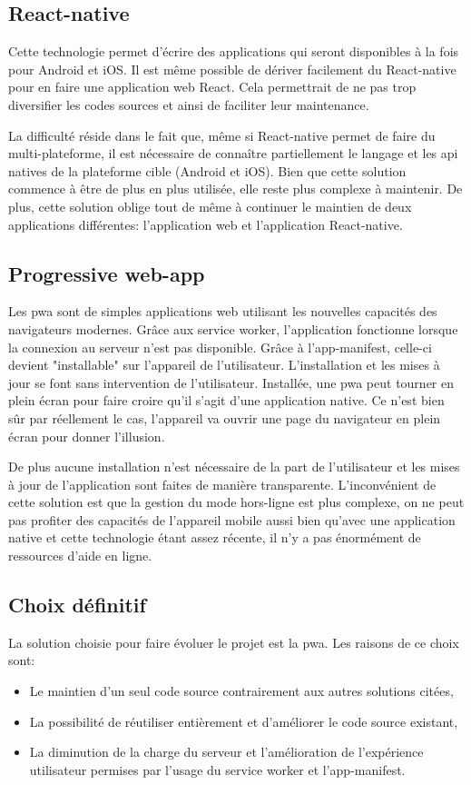 \documentclass{EPL-master-thesis-covers-FR}
\begin{document}
			\subsection*{React-native}
				Cette technologie permet d'écrire des applications qui seront disponibles à la fois pour Android et iOS. Il est même possible de dériver facilement du React-native pour en faire une application web React. Cela permettrait de ne pas trop diversifier les codes sources et ainsi de faciliter leur maintenance.
				
				La difficulté réside dans le fait que, même si React-native permet de faire du multi-plateforme, il est nécessaire de connaître partiellement le langage et les \gls{api} natives de la plateforme cible (Android et iOS). Bien que cette solution commence à être de plus en plus utilisée, elle reste plus complexe à maintenir. De plus, cette solution oblige tout de même à continuer le maintien de deux applications différentes: l'application web et l'application React-native.
				
			\subsection*{Progressive web-app}
				Les \gls{pwa} sont de simples applications web utilisant les nouvelles capacités des navigateurs modernes. Grâce aux service worker, l'application fonctionne lorsque la connexion au serveur n'est pas disponible. Grâce à l'app-manifest, celle-ci devient "installable" sur l'appareil de l'utilisateur. L'installation et les mises à jour se font sans intervention de l'utilisateur. Installée, une \gls{pwa} peut tourner en plein écran pour faire croire qu'il s'agit d'une application native. Ce n'est bien sûr par réellement le cas, l'appareil va ouvrir une page du navigateur en plein écran pour donner l'illusion.
				
				De plus aucune installation n'est nécessaire de la part de l'utilisateur et les mises à jour de l'application sont faites de manière transparente. L'inconvénient de cette solution est que la gestion du mode hors-ligne est plus complexe, on ne peut pas profiter des capacités de l'appareil mobile aussi bien qu'avec une application native et cette technologie étant assez récente, il n'y a pas énormément de ressources d'aide en ligne.
				
			\subsection{Choix définitif} 
				La solution choisie pour faire évoluer le projet est la \gls{pwa}. Les raisons de ce choix sont:
				\begin{itemize}
					\item Le maintien d'un seul code source contrairement aux autres solutions citées,
					\item La possibilité de réutiliser entièrement et d'améliorer le code source existant,
					\item La diminution de la charge du serveur et l'amélioration de l'expérience utilisateur permises par l'usage du service worker et l'app-manifest.
				\end{itemize}
				
\end{document}
